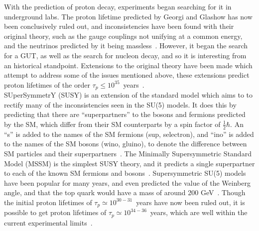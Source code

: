 With the prediction of proton decay, experiments began searching for it in underground labs. The proton lifetime predicted by Georgi and Glashow has now been conclusively ruled out, and inconsistencies have been found with their original theory, such as the gauge couplings not unifying at a common energy, and the neutrinos predicted by it being massless~\citep{Senjanovic:2009kr}. However, it began the search for a GUT, as well as the search for nucleon decay, and so it is interesting from an historical standpoint. Extensions to the original theory have been made which attempt to address some of the issues mentioned above, these extensions predict proton lifetimes of the order $\tau_{p} \leq 10^{35}$~years~\citep{Foot1989, Dorsner:2005fq}. \\

SUperSymmetrY (SUSY) is an extension of the standard model which aims to to rectify many of the inconsistencies seen in the SU(5) models. It does this by predicting that there are ``superpartners'' to the bosons and fermions predicted by the SM, which differ from their SM counterparts by a spin factor of $\frac{1}{2}\hbar$. An ``s'' is added to the names of the SM fermions (sup, selectron), and ``ino'' is added to the names of the SM bosons (wino, gluino), to denote the difference between SM particles and their superpartners~\citep{Martin:1997ns}. The Minimally Supersymmetric Standard Model (MSSM) is the simplest SUSY theory, and it predicts a single superpartner to each of the known SM fermions and bosons~\citep{Castano:1993ri}. Supersymmetric SU(5) models have been popular for many years, and even predicted the value of the Weinberg angle, and that the top quark would have a mass of around 200 GeV~\citep{Senjanovic:2009kr}. Though the initial proton lifetimes of $\tau_{p} \simeq 10^{30-31}$~years have now been ruled out, it is possible to get proton lifetimes of $\tau_{p} \simeq 10^{34-36}$~years, which are well within the current experimental limits~\citep{Gomez:1999kv}. \\

